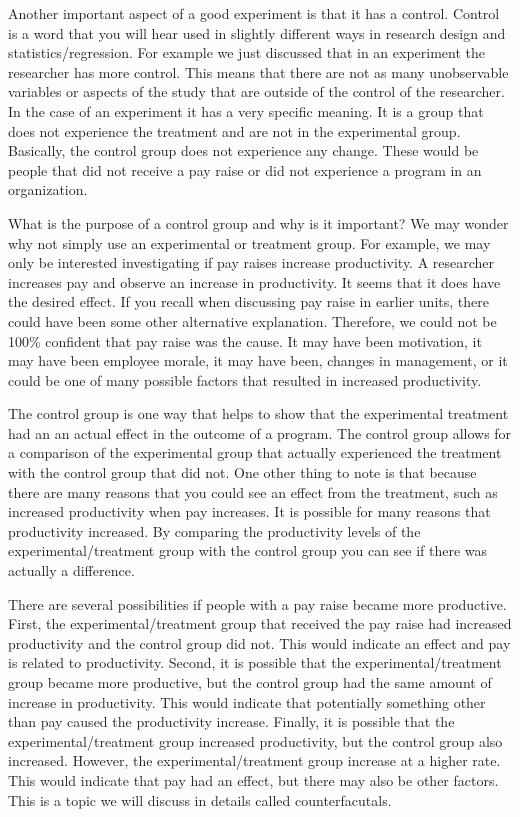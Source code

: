 \documentclass[]{book}
\theoremstyle{definition}
\theoremstyle{definition}
\theoremstyle{definition}
\theoremstyle{remark}
\begin{document}
Another important aspect of a good experiment is that it has a control.
Control is a word that you will hear used in slightly different ways in
research design and statistics/regression. For example we just discussed
that in an experiment the researcher has more control. This means that
there are not as many unobservable variables or aspects of the study
that are outside of the control of the researcher. In the case of an
experiment it has a very specific meaning. It is a group that does not
experience the treatment and are not in the experimental group.
Basically, the control group does not experience any change. These would
be people that did not receive a pay raise or did not experience a
program in an organization.

What is the purpose of a control group and why is it important? We may
wonder why not simply use an experimental or treatment group. For
example, we may only be interested investigating if pay raises increase
productivity. A researcher increases pay and observe an increase in
productivity. It seems that it does have the desired effect. If you
recall when discussing pay raise in earlier units, there could have been
some other alternative explanation. Therefore, we could not be 100\%
confident that pay raise was the cause. It may have been motivation, it
may have been employee morale, it may have been, changes in management,
or it could be one of many possible factors that resulted in increased
productivity.

The control group is one way that helps to show that the experimental
treatment had an an actual effect in the outcome of a program. The
control group allows for a comparison of the experimental group that
actually experienced the treatment with the control group that did not.
One other thing to note is that because there are many reasons that you
could see an effect from the treatment, such as increased productivity
when pay increases. It is possible for many reasons that productivity
increased. By comparing the productivity levels of the
experimental/treatment group with the control group you can see if there
was actually a difference.

There are several possibilities if people with a pay raise became more
productive. First, the experimental/treatment group that received the
pay raise had increased productivity and the control group did not. This
would indicate an effect and pay is related to productivity. Second, it
is possible that the experimental/treatment group became more
productive, but the control group had the same amount of increase in
productivity. This would indicate that potentially something other than
pay caused the productivity increase. Finally, it is possible that the
experimental/treatment group increased productivity, but the control
group also increased. However, the experimental/treatment group increase
at a higher rate. This would indicate that pay had an effect, but there
may also be other factors. This is a topic we will discuss in details
called counterfacutals.
\end{document}
